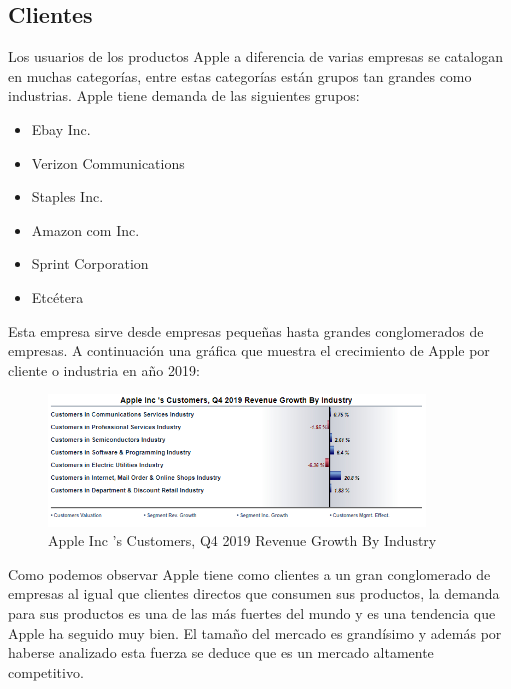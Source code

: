 \documentclass{article}
\begin{document}
\subsection{Clientes}
Los usuarios de los productos Apple a diferencia de varias empresas se catalogan en muchas categorías, entre estas categorías están grupos tan grandes como industrias. Apple tiene demanda de las siguientes grupos:
\begin{itemize}
    \item Ebay Inc. 
    \item Verizon Communications 
    \item Staples Inc. 
    \item Amazon com Inc. 
    \item Sprint Corporation 
    \item Etcétera
\end{itemize}

Esta empresa sirve desde empresas pequeñas hasta grandes conglomerados de empresas. A continuación una gráfica que muestra el crecimiento de Apple por cliente o industria en año 2019: 
\begin{center}
    \begin{figure}[htb]
        \centering
        \includegraphics[width=10cm]{./figs/global.PNG}
        \caption{Apple Inc 's Customers, Q4 2019 Revenue Growth By Industry}
    \end{figure}
\end{center}
Como podemos observar Apple tiene como clientes a un gran conglomerado de empresas al igual que clientes directos que consumen sus productos, la demanda para sus productos es una de las más fuertes del mundo y es una tendencia que Apple ha seguido muy bien. El tamaño del mercado es grandísimo y además por haberse analizado esta fuerza se deduce que es un mercado altamente competitivo.


\end{document}
